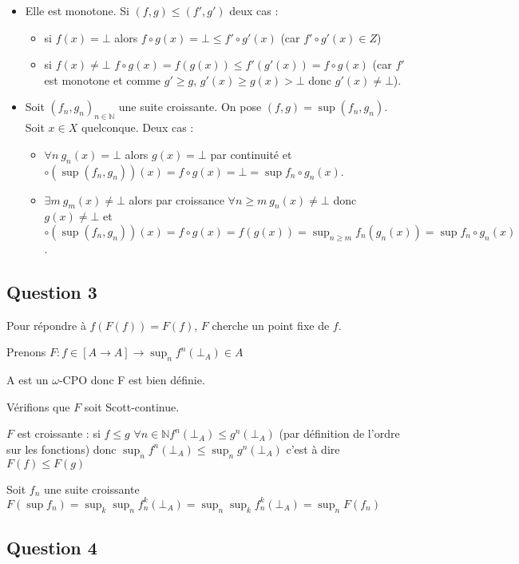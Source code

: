 \documentclass{article}
\newcommand{\N}{\mathbb{N}}
\newcommand{\oCPO}{$\omega$-CPO }
\begin{document}
\begin{itemize}
    \item Elle est monotone. Si $(f, g) \leq (f', g')$ deux cas :
    \begin{itemize}
        \item si $f(x) = \bot$ alors $f\circ g(x) = \bot \leq f'\circ g'(x)$ (car $f'\circ g'(x) \in Z$) 
        \item si $f(x) \neq \bot$ $f\circ g(x) = f(g(x)) \leq f'(g'(x)) = f\circ g(x)$ (car $f'$ est monotone et comme $g' \geq g$, $g'(x) \geq g(x) > \bot$ donc $g'(x) \neq \bot$).
    \end{itemize}
    \item Soit $(f_n, g_n)_{n \in \N}$ une suite croissante. On pose $(f, g) = \sup (f_n, g_n)$. Soit $x \in X$ quelconque. Deux cas :
    \begin{itemize}
        \item $\forall n \: g_n(x) = \bot$ alors $g(x) = \bot$ par continuité et $\circ(\sup (f_n, g_n))(x) = f\circ g(x) = \bot = \sup f_n\circ g_n(x)$.
        \item $\exists m \: g_m(x) \neq \bot$ alors par croissance $\forall n \geq m \: g_n(x) \neq \bot$ donc $g(x) \neq \bot$ et $\circ(\sup (f_n, g_n))(x) = f\circ g(x) = f(g(x)) = \sup_{n \geq m} f_n(g_n(x)) = \sup f_n\circ g_n(x)$.
    \end{itemize}
\end{itemize}

\subsection*{Question 3}

Pour répondre à $f(F(f))=F(f)$, $F$ cherche un point fixe de $f$. 

Prenons $F:f\in [A \rightarrow A] \rightarrow \sup_n f^n(\bot_A) \in A$

A est un \oCPO donc F est bien définie.

Vérifions que $F$ soit Scott-continue.

$F$ est croissante : si $f\leq g$ $\forall n \in \N f^n(\bot_A)\leq g^n(\bot_A)$ (par définition de l'ordre sur les fonctions) donc $\sup_n f^n(\bot_A) \leq \sup_n g^n(\bot_A)$ c'est à dire $F(f)\leq F(g)$

Soit $f_n$ une suite croissante $F(\sup f_n)=\sup_k \sup_n f_n^k(\bot_A)=\sup_n \sup_k f_n^k(\bot_A)=\sup_n F(f_n)$
\subsection*{Question 4}
\end{document}
